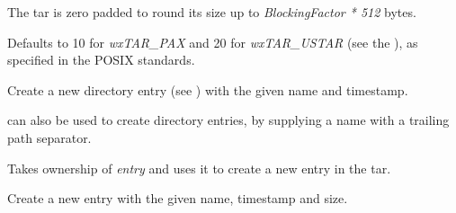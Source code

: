 
The tar is zero padded to round its size up to {\it BlockingFactor * 512} bytes.

Defaults to 10 for {\it wxTAR\_PAX} and 20 for {\it wxTAR\_USTAR}
(see the ), as
specified in the POSIX standards.


\label{wxtaroutputstreamputnextdirentry}


Create a new directory entry
(see )
with the given name and timestamp.

 can
also be used to create directory entries, by supplying a name with
a trailing path separator.


\label{wxtaroutputstreamputnextentry}


Takes ownership of {\it entry} and uses it to create a new entry
in the tar. 


Create a new entry with the given name, timestamp and size.

